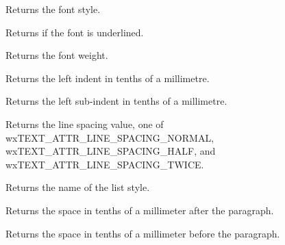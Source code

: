 
Returns the font style.

\label{wxrichtextattrgetfontunderlined}


Returns \true if the font is underlined.

\label{wxrichtextattrgetfontweight}


Returns the font weight.

\label{wxrichtextattrgetleftindent}


Returns the left indent in tenths of a millimetre.

\label{wxrichtextattrgetleftsubindent}


Returns the left sub-indent in tenths of a millimetre.

\label{wxrichtextattrgetlinespacing}


Returns the line spacing value, one of wxTEXT\_ATTR\_LINE\_SPACING\_NORMAL,
wxTEXT\_ATTR\_LINE\_SPACING\_HALF, and wxTEXT\_ATTR\_LINE\_SPACING\_TWICE.

\label{wxrichtextattrgetliststylename}


Returns the name of the list style.

\label{wxrichtextattrgetparagraphspacingafter}


Returns the space in tenths of a millimeter after the paragraph.

\label{wxrichtextattrgetparagraphspacingbefore}


Returns the space in tenths of a millimeter before the paragraph.

